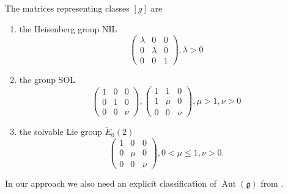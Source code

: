\documentclass[12pt]{article}
\begin{document}
The matrices representing classes $[g]$ are
\begin{enumerate}
\item the Heisenberg group NIL
$$
\begin{pmatrix}
\lambda & 0 & 0\\
0 & \lambda & 0\\
0 & 0 &1
\end{pmatrix}, \lambda>0
$$
\item the group SOL
$$
\begin{pmatrix}
1 & 0 & 0\\
0 & 1 & 0\\
0 & 0 & \nu
\end{pmatrix}, 
\begin{pmatrix}
1 & 1 & 0\\
1 & \mu & 0\\
0 & 0 & \nu
\end{pmatrix}, \mu>1, \nu>0
$$
\item the solvable Lie group $\tilde{E}_0(2)$
$$
\begin{pmatrix}
1 & 0  & 0\\
0 & \mu & 0\\
0 & 0 & \nu
\end{pmatrix}, 0<\mu \leq 1,\nu >0.
$$
 
\end{enumerate} 
In our approach we also need an explicit classification of $\operatorname{Aut}(\mathfrak{g})$ from \cite{KHL}.
\end{document}
